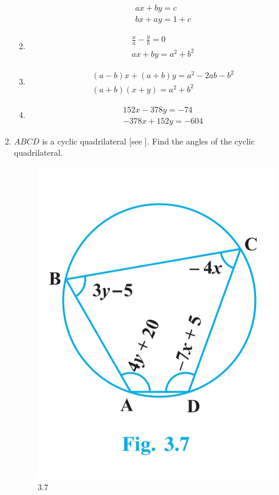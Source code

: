 \documentclass{article}
\theoremstyle{remark}
\begin{document}
\begin{enumerate}
\begin{enumerate}
\begin{align}
ax+by=c\\ bx+ay=1+c
\end{align}
\item 
\begin{align}
\frac {x}{a}-\frac{y}{b}=0\\ ax+by=a^2+b^2
\end{align}
\item
\begin{align}
(a-b)x+(a+b)y=a^2-2ab-b^2\\ (a+b)(x+y)=a^2+b^2
\end{align}
\item
\begin{align}
152x-378y=-74\\ -378x+152y=-604
\end{align}
\end{enumerate}
\item $ABCD$ is a cyclic quadrilateral [see ]. Find the angles of the cyclic quadrilateral.
\begin{figure}[ht]
\centering
\includegraphics[width=\columnwidth]{figs/3.7.png}
\caption{3.7}
  \label{fig:3.7}
\end{figure}
\end{enumerate}
\end{document}
